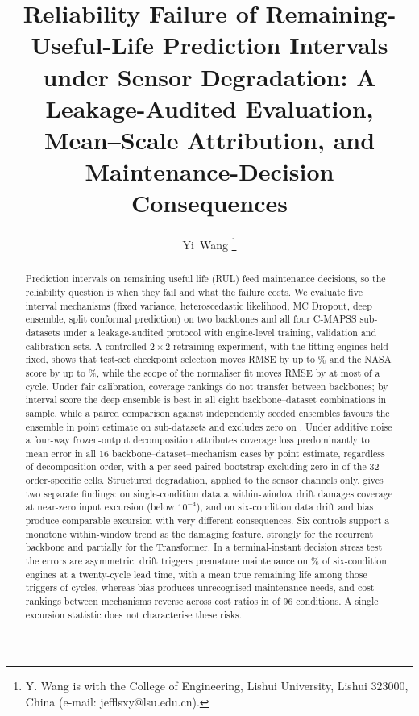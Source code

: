 \documentclass[journal]{IEEEtran}
\begin{document}
\title{Reliability Failure of Remaining-Useful-Life Prediction Intervals under Sensor Degradation: A Leakage-Audited Evaluation, Mean--Scale Attribution, and Maintenance-Decision Consequences}
\author{Yi~Wang%
\thanks{Y. Wang is with the College of Engineering, Lishui University, Lishui 323000, China (e-mail: jefflsxy@lsu.edu.cn).}}
\maketitle

\begin{abstract}
Prediction intervals on remaining useful life (RUL) feed maintenance decisions, so the reliability question is when they fail and what the failure costs. We evaluate five interval mechanisms (fixed variance, heteroscedastic likelihood, MC Dropout, deep ensemble, split conformal prediction) on two backbones and all four C-MAPSS sub-datasets under a leakage-audited protocol with engine-level training, validation and calibration sets. A controlled $2\times2$ retraining experiment, with the fitting engines held fixed, shows that test-set checkpoint selection moves RMSE by up to \NLeakRMSEmax\% and the NASA score by up to \NLeakScoremax\%, while the scope of the normaliser fit moves RMSE by at most \NNormAbsMaxRMSE{} of a cycle. Under fair calibration, coverage rankings do not transfer between backbones; by interval score the deep ensemble is best in all eight backbone--dataset combinations in sample, while a paired comparison against independently seeded ensembles favours the ensemble in point estimate on \NIndepPosN{} sub-datasets and excludes zero on \NIndepSigN. Under additive noise a four-way frozen-output decomposition attributes coverage loss predominantly to mean error in all 16 backbone--dataset--mechanism cases by point estimate, regardless of decomposition order, with a per-seed paired bootstrap excluding zero in \NCITot{} of the 32 order-specific cells. Structured degradation, applied to the sensor channels only, gives two separate findings: on single-condition data a within-window drift damages coverage at near-zero input excursion (below $10^{-4}$), and on six-condition data drift and bias produce comparable excursion with very different consequences. Six controls support a monotone within-window trend as the damaging feature, strongly for the recurrent backbone and partially for the Transformer. In a terminal-instant decision stress test the errors are asymmetric: drift triggers premature maintenance on \NDriftPremTwenty\% of six-condition engines at a twenty-cycle lead time, with a mean true remaining life among those triggers of \NDriftRULunc{} cycles, whereas bias produces unrecognised maintenance needs, and cost rankings between mechanisms reverse across cost ratios in \NRev{} of 96 conditions. A single excursion statistic does not characterise these risks.
\end{abstract}
\end{document}
